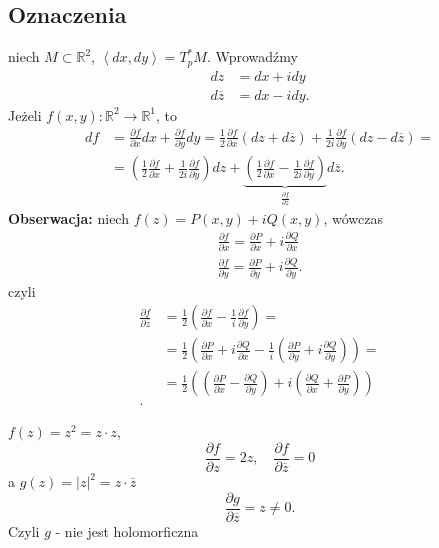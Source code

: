\documentclass[../main.tex]{subfiles}
\begin{document}
    \subsection{Oznaczenia}
    niech $M\subset\mathbb{R}^2$, $\left<dx, dy \right> = T_p^* M$. Wprowadźmy
    \begin{align*}
        dz &= dx + idy\\
        d\overline{z} &= dx - idy
    .\end{align*}
    Jeżeli $f(x,y): \mathbb{R}^2\to \mathbb{R}^1$, to
    \begin{align*}
        df &= \frac{\partial f}{\partial x} dx + \frac{\partial f}{\partial y} dy = \frac{1}{2} \frac{\partial f}{\partial x} \left( dz + d\overline{z} \right) + \frac{1}{2i} \frac{\partial f}{\partial y} \left( dz - d\overline{z} \right) =\\
        &= \left( \frac{1}{2}\frac{\partial f}{\partial x} + \frac{1}{2i}\frac{\partial f}{\partial y}  \right) dz + \underbrace{\left( \frac{1}{2}\frac{\partial f}{\partial x} - \frac{1}{2i}\frac{\partial f}{\partial y}  \right)}_{\frac{\partial f}{\partial \overline{z}} }d\overline{z}
    .\end{align*}
\textbf{Obserwacja:} niech $f(z) = P(x,y) + i Q(x,y)$, wówczas
\begin{align*}
    \frac{\partial f}{\partial x} = \frac{\partial P}{\partial x} + i \frac{\partial Q}{\partial x} \\ \frac{\partial f}{\partial y} = \frac{\partial P}{\partial y} + i \frac{\partial Q}{\partial y}
.\end{align*}
czyli
\begin{align*}
    \frac{\partial f}{\partial \overline{z}} &= \frac{1}{2} \left( \frac{\partial f}{\partial x} - \frac{1}{i} \frac{\partial f}{\partial y}  \right) = \\
    &= \frac{1}{2} \left( \frac{\partial P}{\partial x} + i \frac{\partial Q}{\partial x} - \frac{1}{i}\left( \frac{\partial P}{\partial y} + i \frac{\partial Q}{\partial y}  \right)  \right)  =\\
    &= \frac{1}{2} \left(\left( \frac{\partial P}{\partial x}  - \frac{\partial Q}{\partial y}  \right) + i \left(\frac{\partial Q}{\partial x} + \frac{\partial P}{\partial y}\right)\right)  \\
.\end{align*}
\begin{przyklad}
    $f(z) = z^2 = z\cdot z$,\\
    \[
        \frac{\partial f}{\partial z} = 2z,\quad \frac{\partial f}{\partial \overline{z}} = 0
    \]
    a $g(z) = |z|^2 = z\cdot \overline{z}$
    \[
        \frac{\partial g}{\partial \overline{z}} = z \neq 0
    .\] Czyli $g$ - nie jest holomorficzna
\end{przyklad}
\end{document}
